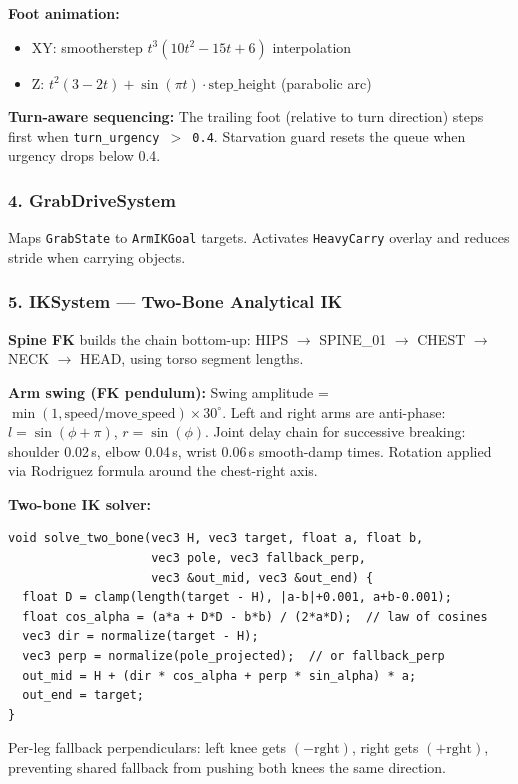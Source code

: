 \documentclass[11pt,a4paper]{article}
\begin{document}
\textbf{Foot animation:}
\begin{itemize}
  \item XY: smootherstep $t^3(10t^2 - 15t + 6)$ interpolation
  \item Z: $t^2(3-2t) + \sin(\pi t) \cdot \text{step\_height}$ (parabolic arc)
\end{itemize}

\textbf{Turn-aware sequencing:} The trailing foot (relative to turn direction) steps first when \texttt{turn\_urgency $>$ 0.4}. Starvation guard resets the queue when urgency drops below 0.4.

\subsubsection{4. GrabDriveSystem}

Maps \texttt{GrabState} to \texttt{ArmIKGoal} targets. Activates \texttt{HeavyCarry} overlay and reduces stride when carrying objects.

\subsubsection{5. IKSystem --- Two-Bone Analytical IK}

\textbf{Spine FK} builds the chain bottom-up: HIPS $\to$ SPINE\_01 $\to$ CHEST $\to$ NECK $\to$ HEAD, using torso segment lengths.

\textbf{Arm swing (FK pendulum):} Swing amplitude = $\min(1, \text{speed}/\text{move\_speed}) \times 30^\circ$. Left and right arms are anti-phase: $l = \sin(\phi + \pi)$, $r = \sin(\phi)$. Joint delay chain for successive breaking: shoulder 0.02\,s, elbow 0.04\,s, wrist 0.06\,s smooth-damp times. Rotation applied via Rodriguez formula around the chest-right axis.

\textbf{Two-bone IK solver:}
\begin{lstlisting}[caption={Two-bone analytical IK}]
void solve_two_bone(vec3 H, vec3 target, float a, float b,
                    vec3 pole, vec3 fallback_perp,
                    vec3 &out_mid, vec3 &out_end) {
  float D = clamp(length(target - H), |a-b|+0.001, a+b-0.001);
  float cos_alpha = (a*a + D*D - b*b) / (2*a*D);  // law of cosines
  vec3 dir = normalize(target - H);
  vec3 perp = normalize(pole_projected);  // or fallback_perp
  out_mid = H + (dir * cos_alpha + perp * sin_alpha) * a;
  out_end = target;
}
\end{lstlisting}

Per-leg fallback perpendiculars: left knee gets $(-\text{rght})$, right gets $(+\text{rght})$, preventing shared fallback from pushing both knees the same direction.
\end{document}

